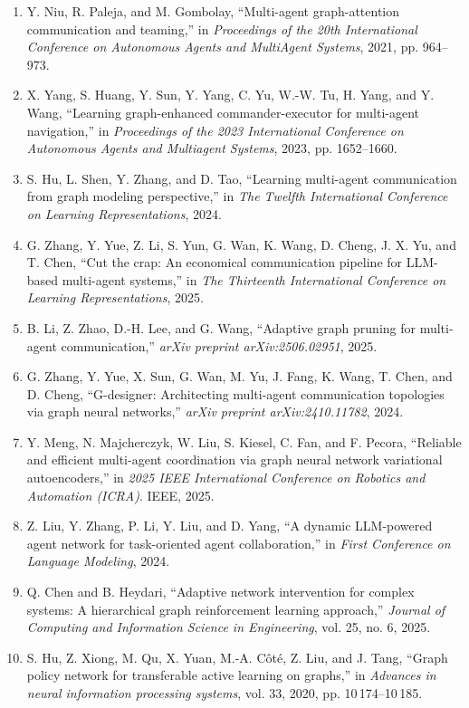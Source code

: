 \documentclass[10pt,UTF8,fontset=fandol]{ctexart}
\begin{document}
\begin{enumerate}[leftmargin=2.4em,labelsep=0.4em,itemsep=0.15em]
\item Y. Niu, R. Paleja, and M. Gombolay, ``Multi-agent graph-attention communication and teaming,'' in \textit{Proceedings of the 20th International Conference on Autonomous Agents and MultiAgent Systems}, 2021, pp. 964--973.
\item X. Yang, S. Huang, Y. Sun, Y. Yang, C. Yu, W.-W. Tu, H. Yang, and Y. Wang, ``Learning graph-enhanced commander-executor for multi-agent navigation,'' in \textit{Proceedings of the 2023 International Conference on Autonomous Agents and Multiagent Systems}, 2023, pp. 1652--1660.
\item S. Hu, L. Shen, Y. Zhang, and D. Tao, ``Learning multi-agent communication from graph modeling perspective,'' in \textit{The Twelfth International Conference on Learning Representations}, 2024.
\item G. Zhang, Y. Yue, Z. Li, S. Yun, G. Wan, K. Wang, D. Cheng, J. X. Yu, and T. Chen, ``Cut the crap: An economical communication pipeline for LLM-based multi-agent systems,'' in \textit{The Thirteenth International Conference on Learning Representations}, 2025.
\item B. Li, Z. Zhao, D.-H. Lee, and G. Wang, ``Adaptive graph pruning for multi-agent communication,'' \textit{arXiv preprint arXiv:2506.02951}, 2025.
\item G. Zhang, Y. Yue, X. Sun, G. Wan, M. Yu, J. Fang, K. Wang, T. Chen, and D. Cheng, ``G-designer: Architecting multi-agent communication topologies via graph neural networks,'' \textit{arXiv preprint arXiv:2410.11782}, 2024.
\item Y. Meng, N. Majcherczyk, W. Liu, S. Kiesel, C. Fan, and F. Pecora, ``Reliable and efficient multi-agent coordination via graph neural network variational autoencoders,'' in \textit{2025 IEEE International Conference on Robotics and Automation (ICRA)}. IEEE, 2025.
\item Z. Liu, Y. Zhang, P. Li, Y. Liu, and D. Yang, ``A dynamic LLM-powered agent network for task-oriented agent collaboration,'' in \textit{First Conference on Language Modeling}, 2024.
\item Q. Chen and B. Heydari, ``Adaptive network intervention for complex systems: A hierarchical graph reinforcement learning approach,'' \textit{Journal of Computing and Information Science in Engineering}, vol. 25, no. 6, 2025.
\item S. Hu, Z. Xiong, M. Qu, X. Yuan, M.-A. Côté, Z. Liu, and J. Tang, ``Graph policy network for transferable active learning on graphs,'' in \textit{Advances in neural information processing systems}, vol. 33, 2020, pp. 10\,174--10\,185.

\end{enumerate}
\end{document}
